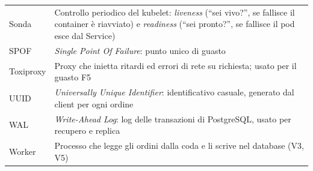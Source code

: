 \begin{longtable}{@{}lp{11.5cm}@{}}
Sonda    & Controllo periodico del kubelet: \textit{liveness} (``sei vivo?'', se fallisce il container è riavviato) e \textit{readiness} (``sei pronto?'', se fallisce il pod esce dal Service) \\
SPOF     & \textit{Single Point Of Failure}: punto unico di guasto \\
Toxiproxy & Proxy che inietta ritardi ed errori di rete su richiesta; usato per il guasto F5 \\
UUID     & \textit{Universally Unique Identifier}: identificativo casuale, generato dal client per ogni ordine \\
WAL      & \textit{Write-Ahead Log}: log delle transazioni di PostgreSQL, usato per recupero e replica \\
Worker   & Processo che legge gli ordini dalla coda e li scrive nel database (V3, V5) \\
\end{longtable}
